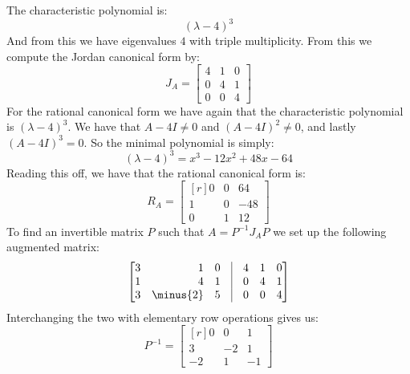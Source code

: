 \documentclass[crop=false,class=article]{standalone}                           %
\begin{document}
        \section{}
        The characteristic polynomial is:
        \begin{equation}
            (\lambda-4)^{3}
        \end{equation}
        And from this we have eigenvalues $4$ with triple multiplicity. From
        this we compute the Jordan canonical form by:
        \begin{equation}
            J_{A}=
            \begin{bmatrix}
                4&1&0\\
                0&4&1\\
                0&0&4
            \end{bmatrix}
        \end{equation}
        For the rational canonical form we have again that the characteristic
        polynomial is $(\lambda-4)^{3}$. We have that $A-4I\ne{0}$ and
        $(A-4I)^{2}\ne{0}$, and lastly $(A-4I)^{3}=0$. So the minimal
        polynomial is simply:
        \begin{equation}
            (\lambda-4)^{3}=x^{3}-12x^{2}+48x-64
        \end{equation}
        Reading this off, we have that the rational canonical form is:
        \begin{equation}
            R_{A}=
            \begin{bmatrix*}[r]
                0&0&64\\
                1&0&\minus{48}\\
                0&1&12
            \end{bmatrix*}
        \end{equation}
        To find an invertible matrix $P$ such that $A=P^{\minus{1}}J_{A}P$ we
        set up the following augmented matrix:
        \begin{equation}
            \begin{bmatrix*}[r]
                3&1&0&\vline&4&1&0\\
                1&4&1&\vline&0&4&1\\
                3&\minus{2}&5&\vline&0&0&4
            \end{bmatrix*}
        \end{equation}
        Interchanging the two with elementary row operations gives us:
        \begin{equation}
            P^{\minus{1}}=
            \begin{bmatrix*}[r]
                0&0&1\\
                3&\minus{2}&1\\
                \minus{2}&1&\minus{1}
            \end{bmatrix*}
        \end{equation}
\end{document}
